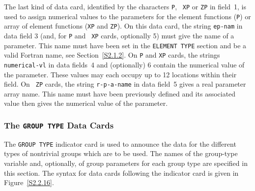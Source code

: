 \documentclass[a4paper]{article}
\begin{document}
The last kind of data card,
identified by the characters {\tt P}, {\tt
XP} or {\tt ZP}
in field~1, is used  to assign numerical values to the
parameters
for the  element functions   ({\tt P}) or  array
of element
functions ({\tt XP} and {\tt ZP}). On this data card,
the string {\tt ep-nam} in data field  3 (and, for  {\tt P} and {\tt
XP}  cards, optionally 5) must give  the name of a parameter.
This  name must have  been set  in the {\tt ELEMENT TYPE}  section and be a
valid Fortran  name,
see Section~\ref{S2.1.2}.  On  {\tt   P} and {\tt XP}
cards,  the strings  {\tt      numerical-vl} in  data  fields~4    and
(optionally) 6 contain  the  numerical value  of the parameter.  These
values may each occupy up to 12 locations within their field.  On {\tt
ZP}  cards,
the  string {\tt r-p-a-name}  in data field~5 gives a real
parameter array name.
This  name must have  been  previously  defined  and its
associated value then gives the numerical value of the parameter.

\subsubsection{\label{S2.2.16}The {\tt GROUP TYPE} Data Cards}

The {\tt GROUP TYPE}
indicator card
is used to announce  the data for
the different types of nontrivial  groups which are to  be used.   The
names of the group-type variable and, optionally, of  group parameters
for each group type  are  specified in this  section.  The  syntax for
data   cards
following    the   indicator    card
is given in Figure~\ref{S2.2.16}.
\end{document}
